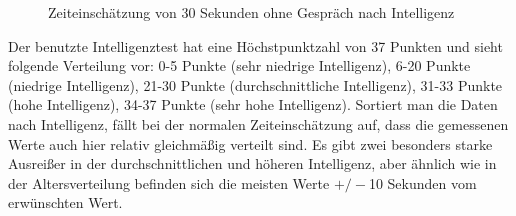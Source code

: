 \documentclass{Paper}
\begin{document}
\begin{figure}[H]
\begin{minipage}[t]{0.49\linewidth}
\caption{Zeiteinschätzung von 30 Sekunden ohne Gespräch nach Intelligenz}
\label{Zeit30sekInt}
\end{minipage}
\end{figure}

Der benutzte Intelligenztest hat eine Höchstpunktzahl von 37 Punkten und sieht folgende Verteilung vor: 0-5 Punkte (sehr niedrige Intelligenz), 6-20 Punkte (niedrige Intelligenz), 21-30 Punkte (durchschnittliche Intelligenz), 31-33 Punkte (hohe Intelligenz), 34-37 Punkte (sehr hohe Intelligenz).
Sortiert man die Daten nach Intelligenz, fällt bei der normalen Zeiteinschätzung auf, dass die gemessenen Werte auch hier relativ gleichmäßig verteilt sind. Es gibt zwei besonders starke Ausreißer in der durchschnittlichen und höheren Intelligenz, aber ähnlich wie in der Altersverteilung befinden sich die meisten Werte $+/-$10 Sekunden vom erwünschten Wert.
\end{document}
